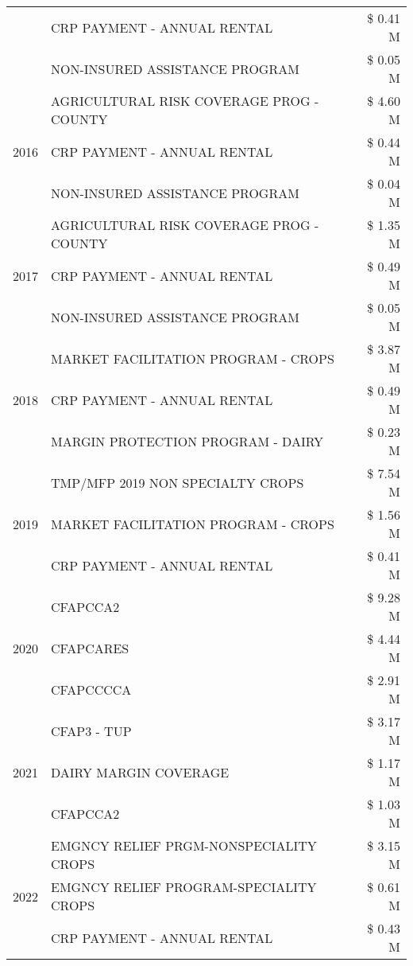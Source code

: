 \begin{tabular}{llr}
 & CRP PAYMENT - ANNUAL RENTAL & \$ 0.41 M \\
 & NON-INSURED ASSISTANCE PROGRAM & \$ 0.05 M \\
\cline{1-3}
\multirow[t]{3}{*}{2016} & AGRICULTURAL RISK COVERAGE PROG - COUNTY & \$ 4.60 M \\
 & CRP PAYMENT - ANNUAL RENTAL & \$ 0.44 M \\
 & NON-INSURED ASSISTANCE PROGRAM & \$ 0.04 M \\
\cline{1-3}
\multirow[t]{3}{*}{2017} & AGRICULTURAL RISK COVERAGE PROG - COUNTY & \$ 1.35 M \\
 & CRP PAYMENT - ANNUAL RENTAL & \$ 0.49 M \\
 & NON-INSURED ASSISTANCE PROGRAM & \$ 0.05 M \\
\cline{1-3}
\multirow[t]{3}{*}{2018} & MARKET FACILITATION PROGRAM - CROPS & \$ 3.87 M \\
 & CRP PAYMENT - ANNUAL RENTAL & \$ 0.49 M \\
 & MARGIN PROTECTION PROGRAM - DAIRY & \$ 0.23 M \\
\cline{1-3}
\multirow[t]{3}{*}{2019} & TMP/MFP 2019 NON SPECIALTY CROPS & \$ 7.54 M \\
 & MARKET FACILITATION PROGRAM - CROPS & \$ 1.56 M \\
 & CRP PAYMENT - ANNUAL RENTAL & \$ 0.41 M \\
\cline{1-3}
\multirow[t]{3}{*}{2020} & CFAPCCA2 & \$ 9.28 M \\
 & CFAPCARES & \$ 4.44 M \\
 & CFAPCCCCA & \$ 2.91 M \\
\cline{1-3}
\multirow[t]{3}{*}{2021} & CFAP3 - TUP & \$ 3.17 M \\
 & DAIRY MARGIN COVERAGE & \$ 1.17 M \\
 & CFAPCCA2 & \$ 1.03 M \\
\cline{1-3}
\multirow[t]{3}{*}{2022} & EMGNCY RELIEF PRGM-NONSPECIALITY CROPS & \$ 3.15 M \\
 & EMGNCY RELIEF PROGRAM-SPECIALITY CROPS & \$ 0.61 M \\
 & CRP PAYMENT - ANNUAL RENTAL & \$ 0.43 M \\
\cline{1-3}
\bottomrule
\end{tabular}

